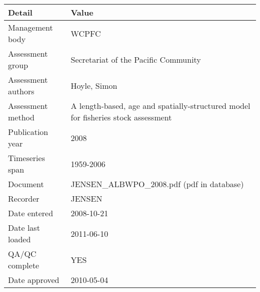 \begin{table}[htb]
\centering
\begin{tabular}{lp{7cm}}
\toprule
Detail & Value \\
\midrule
Management body    & WCPFC                                                                             \\
Assessment group   & Secretariat of the Pacific Community                                              \\
Assessment authors & Hoyle, Simon                                                                      \\
Assessment method  & A length-based, age and spatially-structured model for fisheries stock assessment \\
Publication year   & 2008                                                                              \\
Timeseries span    & 1959-2006                                                                         \\
Document           & JENSEN\_ALBWPO\_2008.pdf (pdf in database)                                        \\
Recorder           & JENSEN                                                                            \\
Date entered       & 2008-10-21                                                                        \\
Date last loaded   & 2011-06-10                                                                        \\
QA/QC complete     & YES                                                                               \\
Date approved      & 2010-05-04                                                                        \\
\bottomrule
\end{tabular}
\label{tab:assessdet}
\end{table}

